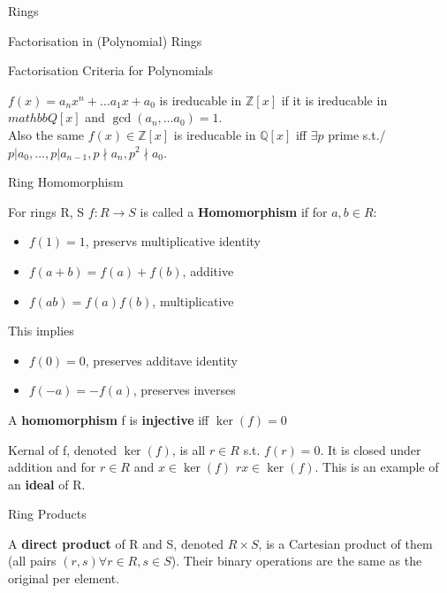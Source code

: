 \documentclass[12pt, letterpaper]{article}
\begin{document}
\begin{section}{Rings}
\begin{subsection}{Factorisation in (Polynomial) Rings}
    \begin{subsubsection}{Factorisation Criteria for Polynomials}

      \(f(x) = a_{n}x^{n} + \dots a_{1}x + a_{0}\) is ireducable in
      \(\mathbb{Z}[x]\) if it is ireducable in \(mathbb{Q}[x]\) and
      \(\gcd(a_{n}, \dots a_{0}) = 1\). \\
      Also the same \(f(x) \in \mathbb{Z}[x]\) is ireducable in \(\mathbb{Q}[x]\)
      iff \(\exists p\) prime s.t./ \(p | a_{0}, \dots , p | a_{n - 1}, p \nmid
      a_{n}, p^{2} \nmid a_{0}\).

    \end{subsubsection}

  \end{subsection}

  \begin{subsection}{Ring Homomorphism}

    For rings R, S \(f: R \to S\) is called a \textbf{Homomorphism} if for
    \(a, b \in R\):
    \begin{itemize}
      \item \(f(1) = 1\), preservs multiplicative identity
      \item \(f(a + b) = f(a) + f(b)\), additive
      \item \(f(ab) = f(a)f(b)\), multiplicative
    \end{itemize}

    This implies
    \begin{itemize}
      \item \(f(0) = 0\), preserves additave identity
      \item \(f(-a) = -f(a)\), preserves inverses
    \end{itemize}

    A \textbf{homomorphism} f is \textbf{injective} iff \(\ker(f) = 0\)

    Kernal of f, denoted \(\ker(f)\), is all \(r \in R\) s.t. \(f(r) = 0\). It is
    closed under addition and for \(r \in R\) and \(x \in \ker(f)\) \(rx \in \ker(f)\).
    This is an example of an \textbf{ideal} of R.

  \end{subsection}

  \begin{subsection}{Ring Products}

    A \textbf{direct product} of R and S, denoted \(R \times S\), is a Cartesian
    product of them (all pairs \((r, s) \forall r \in R, s \in S\)). Their
    binary operations are the same as the original per element.


\end{subsection}
\end{section}
\end{document}
